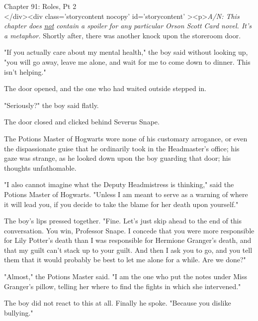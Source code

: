 
Chapter 91: Roles, Pt 2\\
</div><div  class='storycontent nocopy' id='storycontent' ><p>\emph{A/N: This 
chapter does \underline{not} contain a spoiler for any particular Orson Scott 
Card novel. It's a metaphor.}
\sbreak
Shortly after, there was another knock upon the storeroom door.

"If you actually care about my mental health," the boy said without looking up, 
"you will go away, leave me alone, and wait for me to come down to dinner. This 
isn't helping."

The door opened, and the one who had waited outside stepped in.

"Seriously?" the boy said flatly.

The door closed and clicked behind Severus Snape.

The Potions Master of Hogwarts wore none of his customary arrogance, or even 
the dispassionate guise that he ordinarily took in the Headmaster's office; his 
gaze was strange, as he looked down upon the boy guarding that door; his 
thoughts unfathomable.

"I also cannot imagine what the Deputy Headmistress is thinking," said the 
Potions Master of Hogwarts. "Unless I am meant to serve as a warning of where 
it will lead you, if you decide to take the blame for her death upon yourself."

The boy's lips pressed together. "Fine. Let's just skip ahead to the end of 
this conversation. You win, Professor Snape. I concede that you were more 
responsible for Lily Potter's death than I was responsible for Hermione 
Granger's death, and that my guilt can't stack up to your guilt. And then I ask 
you to go, and you tell them that it would probably be best to let me alone for 
a while. Are we done?"

"Almost," the Potions Master said. "I am the one who put the notes under Miss 
Granger's pillow, telling her where to find the fights in which she intervened."

The boy did not react to this at all. Finally he spoke. "Because you dislike 
bullying."

